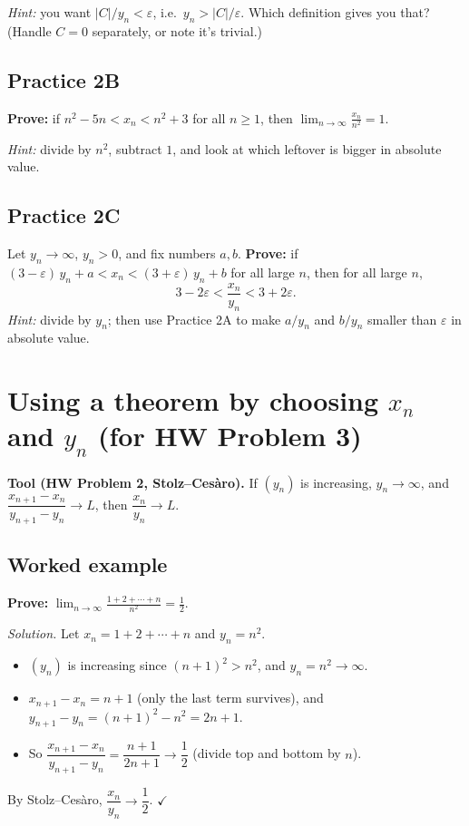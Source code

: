 \documentclass[11pt]{article}
\begin{document}
\emph{Hint:} you want $|C|/y_n<\varepsilon$, i.e.\ $y_n > |C|/\varepsilon$.
Which definition gives you that? (Handle $C=0$ separately, or note it's trivial.)

\vspace{3cm}

\subsection*{Practice 2B}
\textbf{Prove:} if $n^2-5n < x_n < n^2+3$ for all $n\ge1$, then
$\displaystyle\lim_{n\to\infty}\frac{x_n}{n^2}=1$.

\emph{Hint:} divide by $n^2$, subtract $1$, and look at which leftover is
bigger in absolute value.

\vspace{3cm}

\subsection*{Practice 2C}
Let $y_n\to\infty$, $y_n>0$, and fix numbers $a,b$. \textbf{Prove:} if
$(3-\varepsilon)\,y_n + a < x_n < (3+\varepsilon)\,y_n + b$ for all large $n$,
then for all large $n$,
\[
  3-2\varepsilon < \frac{x_n}{y_n} < 3+2\varepsilon .
\]
\emph{Hint:} divide by $y_n$; then use Practice 2A to make $a/y_n$ and
$b/y_n$ smaller than $\varepsilon$ in absolute value.

\vspace{3cm}

\newpage
\section{Using a theorem by choosing $x_n$ and $y_n$ \quad (for HW Problem 3)}

\textbf{Tool (HW Problem 2, Stolz--Ces\`aro).} If $(y_n)$ is increasing,
$y_n\to\infty$, and $\dfrac{x_{n+1}-x_n}{y_{n+1}-y_n}\to L$, then
$\dfrac{x_n}{y_n}\to L$.

\subsection*{Worked example}
\textbf{Prove:} $\displaystyle\lim_{n\to\infty}\frac{1+2+\cdots+n}{n^2}=\frac12$.

\emph{Solution.} Let $x_n = 1+2+\cdots+n$ and $y_n=n^2$.
\begin{itemize}
  \item $(y_n)$ is increasing since $(n+1)^2 > n^2$, and $y_n=n^2\to\infty$.
  \item $x_{n+1}-x_n = n+1$ (only the last term survives), and
        $y_{n+1}-y_n = (n+1)^2-n^2 = 2n+1$.
  \item So $\dfrac{x_{n+1}-x_n}{y_{n+1}-y_n} = \dfrac{n+1}{2n+1} \to \dfrac12$
        (divide top and bottom by $n$).
\end{itemize}
By Stolz--Ces\`aro, $\dfrac{x_n}{y_n}\to\dfrac12$. \hfill$\checkmark$
\end{document}

